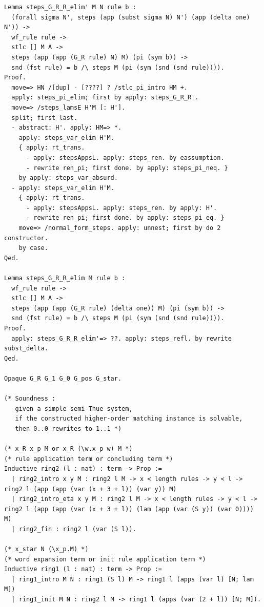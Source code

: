 \begin{lstlisting}
Lemma steps_G_R_R_elim' M N rule b :
  (forall sigma N', steps (app (subst sigma N) N') (app (delta one) N')) ->
  wf_rule rule ->
  stlc [] M A ->
  steps (app (app (G_R rule) N) M) (pi (sym b)) ->
  snd (fst rule) = b /\ steps M (pi (sym (snd (snd rule)))).
Proof.
  move=> HN /[dup] - [????] ? /stlc_pi_intro HM +.
  apply: steps_pi_elim; first by apply: steps_G_R_R'.
  move=> /steps_lamsE H'M [: H'].
  split; first last.
  - abstract: H'. apply: HM=> *.
    apply: steps_var_elim H'M.
    { apply: rt_trans.
      - apply: stepsAppsL. apply: steps_ren. by eassumption.
      - rewrite ren_pi; first done. by apply: steps_pi_neq. }
    by apply: steps_var_absurd.
  - apply: steps_var_elim H'M.
    { apply: rt_trans.
      - apply: stepsAppsL. apply: steps_ren. by apply: H'.
      - rewrite ren_pi; first done. by apply: steps_pi_eq. }
    move=> /normal_form_steps. apply: unnest; first by do 2 constructor.
    by case.
Qed.

Lemma steps_G_R_R_elim M rule b :
  wf_rule rule ->
  stlc [] M A ->
  steps (app (app (G_R rule) (delta one)) M) (pi (sym b)) ->
  snd (fst rule) = b /\ steps M (pi (sym (snd (snd rule)))).
Proof.
  apply: steps_G_R_R_elim'=> ??. apply: steps_refl. by rewrite subst_delta.
Qed.

Opaque G_R G_1 G_0 G_pos G_star.

(* Soundness :
   given a simple semi-Thue system,
   if the constructed higher-order matching instance is solvable,
   then 0..0 rewrites to 1..1 *)

(* x_R x_p M or x_R (\w.x_p w) M *)
(* rule application term or concluding term *)
Inductive ring2 (l : nat) : term -> Prop :=
  | ring2_intro x y M : ring2 l M -> x < length rules -> y < l -> ring2 l (app (app (var (x + 3 + l)) (var y)) M)
  | ring2_intro_eta x y M : ring2 l M -> x < length rules -> y < l -> ring2 l (app (app (var (x + 3 + l)) (lam (app (var (S y)) (var 0)))) M)
  | ring2_fin : ring2 l (var (S l)).

(* x_star N (\x_p.M) *)
(* word expansion term or init rule application term *)
Inductive ring1 (l : nat) : term -> Prop :=
  | ring1_intro M N : ring1 (S l) M -> ring1 l (apps (var l) [N; lam M])
  | ring1_init M N : ring2 l M -> ring1 l (apps (var (2 + l)) [N; M]).


\end{lstlisting}
